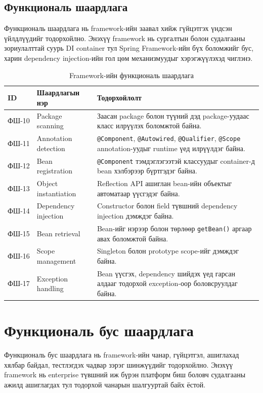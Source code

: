 \subsection{Функциональ шаардлага}
Функциональ шаардлага нь framework-ийн заавал хийж гүйцэтгэх үндсэн үйлдлүүдийг тодорхойлно. Энэхүү framework нь сургалтын болон судалгааны зориулалттай суурь DI container тул Spring Framework-ийн бүх боломжийг бус, харин dependency injection-ийн гол цөм механизмуудыг хэрэгжүүлэхэд чиглэнэ.
\begin{table}[H]
\centering
\small
\setlength{\tabcolsep}{4pt}
\caption{Framework-ийн функциональ шаардлага}
\label{tab:framework-functional-requirements}
\renewcommand{\arraystretch}{1.3}
\begin{tabularx}{\textwidth}{|L{0.14\textwidth}|L{0.24\textwidth}|Y|}
\hline
\textbf{ID} & \textbf{Шаардлагын нэр} & \textbf{Тодорхойлолт} \\ \hline
ФШ-10 & Package scanning & Заасан package болон түүний дэд package-уудаас класс илрүүлэх боломжтой байна. \\ \hline
ФШ-11 & Annotation detection & \texttt{@Component}, \texttt{@Autowired}, \texttt{@Qualifier}, \texttt{@Scope} annotation-уудыг runtime үед илрүүлдэг байна. \\ \hline
ФШ-12 & Bean registration & \texttt{@Component} тэмдэглэгээтэй классуудыг container-д bean хэлбэрээр бүртгэдэг байна. \\ \hline
ФШ-13 & Object instantiation & Reflection API ашиглан bean-ийн объектыг автоматаар үүсгэдэг байна. \\ \hline
ФШ-14 & Dependency injection & Constructor болон field түвшний dependency injection дэмждэг байна. \\ \hline
ФШ-15 & Bean retrieval & Bean-ийг нэрээр болон төрлөөр \texttt{getBean()} аргаар авах боломжтой байна. \\ \hline
ФШ-16 & Scope management & Singleton болон prototype scope-ийг дэмждэг байна. \\ \hline
ФШ-17 & Exception handling & Bean үүсгэх, dependency шийдэх үед гарсан алдааг тодорхой exception-оор боловсруулдаг байна. \\ \hline
\end{tabularx}
\end{table}
\section{Функциональ бус шаардлага}

Функциональ бус шаардлага нь framework-ийн чанар, гүйцэтгэл, ашиглахад хялбар байдал, тестлэгдэх чадвар зэрэг шинжүүдийг тодорхойлно. Энэхүү framework нь enterprise түвшний иж бүрэн платформ биш боловч судалгааны ажилд ашиглагдах тул тодорхой чанарын шалгууртай байх ёстой.

